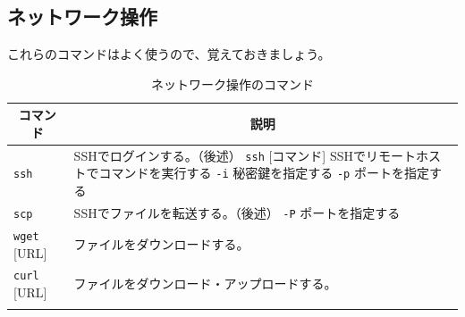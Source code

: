 \documentclass[a4j]{ltjreport}
\begin{document}
    \subsection{ネットワーク操作}
    これらのコマンドはよく使うので、覚えておきましょう。
    \begin{longtable}[c]{|p{3.5cm}|p{13.5cm}|}
        \hline
        \multicolumn{1}{|c|}{\textbf{コマンド}}&\multicolumn{1}{|c|}{\textbf{説明}}\\
        \hline\hline
        \texttt{ssh} &SSHでログインする。（後述） \texttt{ssh} [コマンド] SSHでリモートホストでコマンドを実行する \texttt{-i} 秘密鍵を指定する \texttt{-p} ポートを指定する\\
        \hline
        \texttt{scp} &SSHでファイルを転送する。（後述） \texttt{-P} ポートを指定する\\
        \hline
        \texttt{wget} [URL] &ファイルをダウンロードする。\\
        \hline
        \texttt{curl} [URL] &ファイルをダウンロード・アップロードする。\\
        \hline
        \caption{ネットワーク操作のコマンド}
    \end{longtable}
\end{document}
